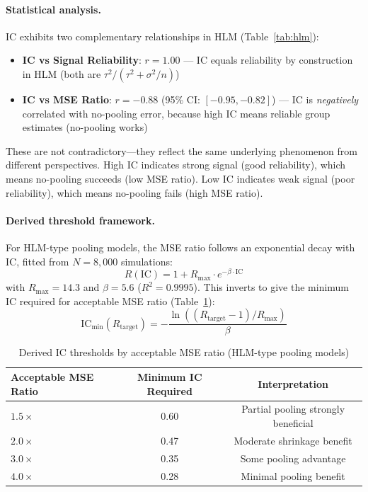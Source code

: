\documentclass[10pt]{article} %
\theoremstyle{plain}
\theoremstyle{definition}
\newcommand{\IC}{\mathrm{IC}}  %
\begin{document}
\paragraph{Statistical analysis.} IC exhibits two complementary relationships in HLM (Table~\ref{tab:hlm}):

\begin{itemize}
    \item \textbf{IC vs Signal Reliability}: $r = 1.00$ --- IC equals reliability by construction in HLM (both are $\tau^2 / (\tau^2 + \sigma^2/n)$)
    \item \textbf{IC vs MSE Ratio}: $r = -0.88$ (95\% CI: $[-0.95, -0.82]$) --- IC is \emph{negatively} correlated with no-pooling error, because high IC means reliable group estimates (no-pooling works)
\end{itemize}

\noindent These are not contradictory---they reflect the same underlying phenomenon from different perspectives. High IC indicates strong signal (good reliability), which means no-pooling succeeds (low MSE ratio). Low IC indicates weak signal (poor reliability), which means no-pooling fails (high MSE ratio).

\paragraph{Derived threshold framework.} For HLM-type pooling models, the MSE ratio follows an exponential decay with IC, fitted from $N = 8{,}000$ simulations:
\begin{equation}
R(\IC) = 1 + R_{\max} \cdot e^{-\beta \cdot \IC}
\label{eq:hlm-threshold}
\end{equation}
with $R_{\max} = 14.3$ and $\beta = 5.6$ ($R^2 = 0.9995$). This inverts to give the minimum IC required for acceptable MSE ratio (Table~\ref{tab:hlm-thresholds}):
\begin{equation}
\IC_{\min}(R_{\text{target}}) = -\frac{\ln((R_{\text{target}} - 1)/R_{\max})}{\beta}
\end{equation}

\begin{table}[!htbp]
\centering
\caption{Derived IC thresholds by acceptable MSE ratio (HLM-type pooling models)}
\label{tab:hlm-thresholds}
\begin{tabular}{lcc}
\toprule
Acceptable MSE Ratio & Minimum IC Required & Interpretation \\
\midrule
$1.5\times$ & 0.60 & Partial pooling strongly beneficial \\
$2.0\times$ & 0.47 & Moderate shrinkage benefit \\
$3.0\times$ & 0.35 & Some pooling advantage \\
$4.0\times$ & 0.28 & Minimal pooling benefit \\
\bottomrule
\end{tabular}
\end{table}
\end{document}
